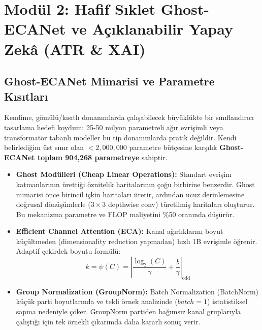 \documentclass[11pt,a4paper]{article}
\begin{document}
\clearpage
\section{Modül 2: Hafif Sıklet Ghost-ECANet ve Açıklanabilir Yapay Zekâ (ATR \& XAI)}

\subsection{Ghost-ECANet Mimarisi ve Parametre Kısıtları}
Kendime, gömülü/kısıtlı donanımlarda çalışabilecek büyüklükte bir sınıflandırıcı tasarlama hedefi koydum: 25-50 milyon parametreli ağır evrişimli veya transformatör tabanlı modeller bu tip donanımlarda pratik değildir. Kendi belirlediğim üst sınır olan $< 2{,}000{,}000$ parametre bütçesine karşılık \textbf{Ghost-ECANet toplam 904{,}268 parametreye} sahiptir.

\begin{itemize}
    \item \textbf{Ghost Modülleri (Cheap Linear Operations):} Standart evrişim katmanlarının ürettiği öznitelik haritalarının çoğu birbirine benzerdir. Ghost mimarisi önce birincil içkin haritaları üretir, ardından ucuz derinlemesine doğrusal dönüşümlerle ($3\times 3$ depthwise conv) türetilmiş haritaları oluşturur. Bu mekanizma parametre ve FLOP maliyetini \%50 oranında düşürür.
    \item \textbf{Efficient Channel Attention (ECA):} Kanal ağırlıklarını boyut küçültmeden (dimensionality reduction yapmadan) hızlı 1B evrişimle öğrenir. Adaptif çekirdek boyutu formülü:
    \begin{equation}
    k = \psi(C) = \left| \frac{\log_2(C)}{\gamma} + \frac{b}{\gamma} \right|_{\text{odd}}
    \end{equation}
    \item \textbf{Group Normalization (GroupNorm):} Batch Normalization (BatchNorm) küçük parti boyutlarında ve tekli örnek analizinde ($batch=1$) istatistiksel sapma nedeniyle çöker. GroupNorm partiden bağımsız kanal gruplarıyla çalıştığı için tek örnekli çıkarımda daha kararlı sonuç verir.
\end{itemize}
\end{document}
